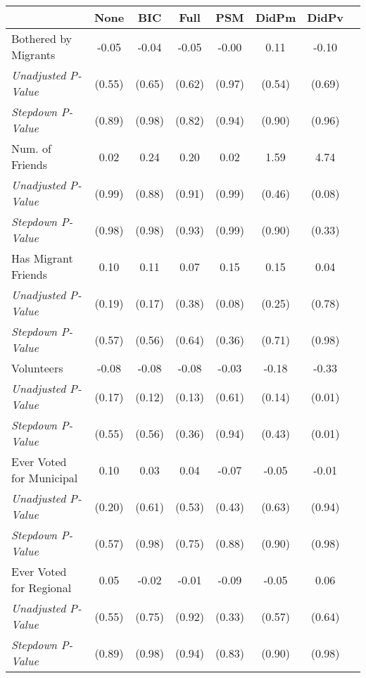 \begin{tabular}{l c c c c c c c}
\toprule
 & None & BIC & Full & PSM & DidPm & DidPv \\
\midrule
Bothered by Migrants & -0.05 & -0.04 & -0.05 & -0.00 & 0.11 & -0.10 \\
\quad \textit{Unadjusted P-Value} & (0.55) & (0.65) & (0.62) & (0.97) & (0.54) & (0.69) \\
\quad \textit{Stepdown P-Value} & (0.89) & (0.98) & (0.82) & (0.94) & (0.90) & (0.96) \\
Num. of Friends & 0.02 & 0.24 & 0.20 & 0.02 & 1.59 & 4.74 \\
\quad \textit{Unadjusted P-Value} & (0.99) & (0.88) & (0.91) & (0.99) & (0.46) & (0.08) \\
\quad \textit{Stepdown P-Value} & (0.98) & (0.98) & (0.93) & (0.99) & (0.90) & (0.33) \\
Has Migrant Friends & 0.10 & 0.11 & 0.07 & 0.15 & 0.15 & 0.04 \\
\quad \textit{Unadjusted P-Value} & (0.19) & (0.17) & (0.38) & (0.08) & (0.25) & (0.78) \\
\quad \textit{Stepdown P-Value} & (0.57) & (0.56) & (0.64) & (0.36) & (0.71) & (0.98) \\
Volunteers & -0.08 & -0.08 & -0.08 & -0.03 & -0.18 & -0.33 \\
\quad \textit{Unadjusted P-Value} & (0.17) & (0.12) & (0.13) & (0.61) & (0.14) & (0.01) \\
\quad \textit{Stepdown P-Value} & (0.55) & (0.56) & (0.36) & (0.94) & (0.43) & (0.01) \\
Ever Voted for Municipal & 0.10 & 0.03 & 0.04 & -0.07 & -0.05 & -0.01 \\
\quad \textit{Unadjusted P-Value} & (0.20) & (0.61) & (0.53) & (0.43) & (0.63) & (0.94) \\
\quad \textit{Stepdown P-Value} & (0.57) & (0.98) & (0.75) & (0.88) & (0.90) & (0.98) \\
Ever Voted for Regional & 0.05 & -0.02 & -0.01 & -0.09 & -0.05 & 0.06 \\
\quad \textit{Unadjusted P-Value} & (0.55) & (0.75) & (0.92) & (0.33) & (0.57) & (0.64) \\
\quad \textit{Stepdown P-Value} & (0.89) & (0.98) & (0.94) & (0.83) & (0.90) & (0.98) \\
\bottomrule
\end{tabular}
